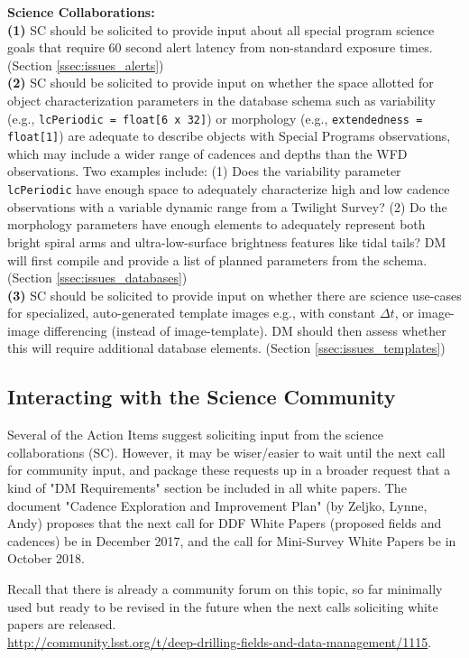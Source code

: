 \documentclass[DM,lsstdraft,toc]{lsstdoc}
\begin{document}
\noindent \textbf{Science Collaborations: } \\
\textbf{(1)} SC should be solicited to provide input about all special program science goals that require 60 second alert latency from non-standard exposure times. (Section \ref{ssec:issues_alerts})\\
\textbf{(2)} SC should be solicited to provide input on whether the space allotted for object characterization parameters in the database schema such as variability (e.g., {\tt lcPeriodic = float[6 x 32]}) or morphology (e.g., {\tt extendedness = float[1]}) are adequate to describe objects with Special Programs observations, which may include a wider range of cadences and depths than the WFD observations. Two examples include: (1) Does the variability parameter {\tt lcPeriodic} have enough space to adequately characterize high and low cadence observations with a variable dynamic range from a Twilight Survey? (2) Do the morphology parameters have enough elements to adequately represent both bright spiral arms and ultra-low-surface brightness features like tidal tails? DM will first compile and provide a list of planned parameters from the schema. (Section \ref{ssec:issues_databases}) \\
\textbf{(3)} SC should be solicited to provide input on whether there are science use-cases for specialized, auto-generated template images e.g., with constant $\Delta t$, or image-image differencing (instead of image-template). DM should then assess whether this will require additional database elements. (Section \ref{ssec:issues_templates}) \\

\subsection{Interacting with the Science Community} \label{ssec:intro_forum}

Several of the Action Items suggest soliciting input from the science collaborations (SC). However, it may be wiser/easier to wait until the next call for community input, and package these requests up in a broader request that a kind of "DM Requirements" section be included in all white papers. The document "Cadence Exploration and Improvement Plan" (by Zeljko, Lynne, Andy) proposes that the next call for DDF White Papers (proposed fields and cadences) be in December 2017, and the call for Mini-Survey White Papers be in October 2018. 

\noindent Recall that there is already a community forum on this topic, so far minimally used but ready to be revised in the future when the next calls soliciting white papers are released. \\ \url{http://community.lsst.org/t/deep-drilling-fields-and-data-management/1115}.
\end{document}
